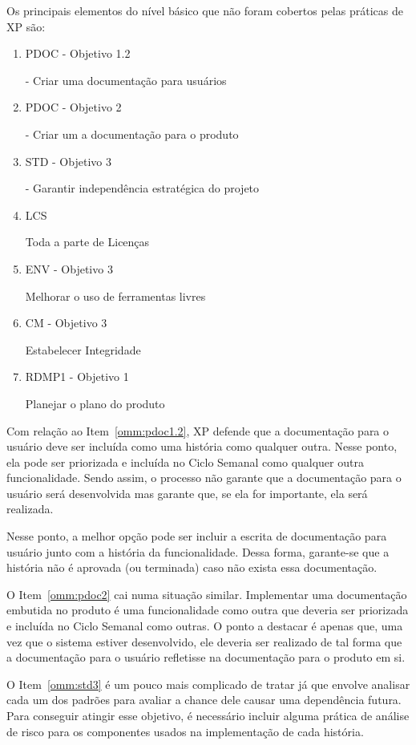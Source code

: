 Os principais elementos do nível básico que não foram cobertos pelas
práticas de XP são:

\begin{enumerate}
\item PDOC - Objetivo 1.2

  - Criar uma documentação para usuários
  \label{omm:pdoc1.2}
\item PDOC - Objetivo 2

  - Criar um a documentação para o produto
  \label{omm:pdoc2}
\item STD - Objetivo 3

  - Garantir independência estratégica do projeto
  \label{omm:std3}
\item LCS

  Toda a parte de Licenças
  \label{omm:lcs}
\item ENV - Objetivo 3

  Melhorar o uso de ferramentas livres
  \label{omm:env3}
\item CM - Objetivo 3

  Estabelecer Integridade
  \label{omm:cm3}
\item RDMP1 - Objetivo 1

  Planejar o plano do produto
  \label{omm:rdmp11}
\end{enumerate}

Com relação ao Item~\ref{omm:pdoc1.2}, XP defende que a documentação
para o usuário deve ser incluída como uma história como qualquer
outra. Nesse ponto, ela pode ser priorizada e incluída no Ciclo
Semanal como qualquer outra funcionalidade. Sendo assim, o processo
não garante que a documentação para o usuário será desenvolvida mas
garante que, se ela for importante, ela será realizada.

Nesse ponto, a melhor opção pode ser incluir a escrita de documentação
para usuário junto com a história da funcionalidade. Dessa forma,
garante-se que a história não é aprovada (ou terminada) caso não
exista essa documentação.

O Item~\ref{omm:pdoc2} cai numa situação similar. Implementar uma
documentação embutida no produto é uma funcionalidade como outra que
deveria ser priorizada e incluída no Ciclo Semanal como outras. O
ponto a destacar é apenas que, uma vez que o sistema estiver
desenvolvido, ele deveria ser realizado de tal forma que a
documentação para o usuário refletisse na documentação para o produto
em si.

O Item~\ref{omm:std3} é um pouco mais complicado de tratar já que
envolve analisar cada um dos padrões para avaliar a chance dele causar
uma dependência futura. Para conseguir atingir esse objetivo, é
necessário incluir alguma prática de análise de risco para os
componentes usados na implementação de cada história.

